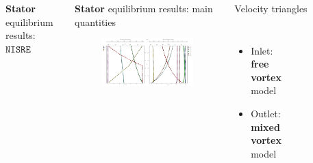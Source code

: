 \begin{columns}
\begin{frame}{\textbf{Stator} equilibrium results: $\mathtt{NISRE}$}
\begin{figure}
		\end{figure}
	\end{frame}
	\begin{frame}{\textbf{Stator} equilibrium results: main quantities}
		\begin{figure}
			\centering
			\includegraphics[width=1\textwidth]{figures/statorThermo.png}
		\end{figure}
	\end{frame}
	{\nologo
	\begin{frame}{Velocity triangles}
		\begin{columns}
				\begin{itemize}	
					\item Inlet: \textbf{free vortex} model
					\item Outlet: \textbf{mixed vortex} model
				\end{itemize}
				\begin{figure}
					\centering
					\includegraphics[width=0.6\textwidth]{figures/rotorVelocityTriangle.png}

\end{figure}
\end{columns}
\end{frame}}
\end{columns}
